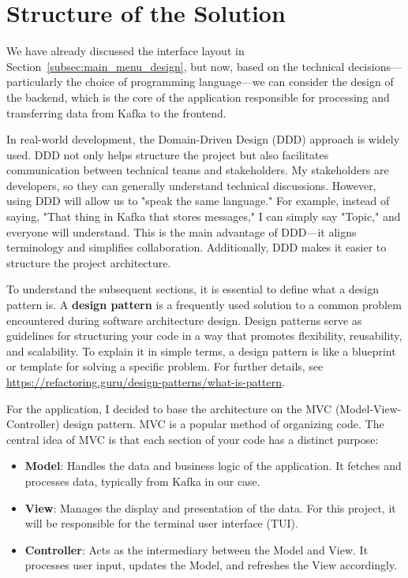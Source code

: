 \documentclass[10pt , a4paper]{report}
\begin{document}
\section{Structure of the Solution}

We have already discussed the interface layout in Section~\ref{subsec:main_menu_design}, but now, based on the technical decisions—particularly the choice of programming language—we can consider the design of the backend, which is the core of the application responsible for processing and transferring data from Kafka to the frontend.

In real-world development, the Domain-Driven Design (DDD) approach is widely used. DDD not only helps structure the project but also facilitates communication between technical teams and stakeholders. My stakeholders are developers, so they can generally understand technical discussions. However, using DDD will allow us to "speak the same language." For example, instead of saying, "That thing in Kafka that stores messages," I can simply say "Topic," and everyone will understand. This is the main advantage of DDD—it aligns terminology and simplifies collaboration. Additionally, DDD makes it easier to structure the project architecture.

To understand the subsequent sections, it is essential to define what a design pattern is. A \textbf{design pattern} is a frequently used solution to a common problem encountered during software architecture design. Design patterns serve as guidelines for structuring your code in a way that promotes flexibility, reusability, and scalability. To explain it in simple terms, a design pattern is like a blueprint or template for solving a specific problem. For further details, see \url{https://refactoring.guru/design-patterns/what-is-pattern}.

For the application, I decided to base the architecture on the MVC (Model-View-Controller) design pattern. MVC is a popular method of organizing code. The central idea of MVC is that each section of your code has a distinct purpose:
\begin{itemize}
    \item \textbf{Model}: Handles the data and business logic of the application. It fetches and processes data, typically from Kafka in our case.
    \item \textbf{View}: Manages the display and presentation of the data. For this project, it will be responsible for the terminal user interface (TUI).
    \item \textbf{Controller}: Acts as the intermediary between the Model and View. It processes user input, updates the Model, and refreshes the View accordingly.
\end{itemize}
\end{document}
